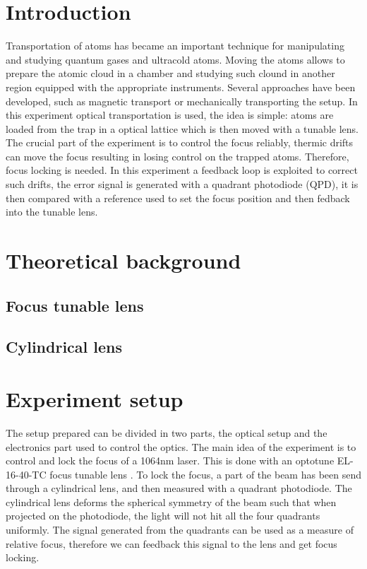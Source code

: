 \documentclass[a4paper,10pt]{article}
\begin{document}
\section{Introduction}
Transportation of atoms has became an important technique for manipulating and studying quantum gases and ultracold atoms. Moving the atoms allows to prepare the atomic cloud in a chamber and studying such clound in another region equipped with the appropriate instruments. Several approaches have been developed, such as magnetic transport or mechanically transporting the setup. In this experiment optical transportation is used, the idea is simple: atoms are loaded from the trap in a optical lattice which is then moved with a tunable lens. The crucial part of the experiment is to control the focus reliably, thermic drifts can move the focus resulting in losing control on the trapped atoms. Therefore, focus locking is needed. In this experiment a feedback loop is exploited to correct such drifts, the error signal is generated with a quadrant photodiode (QPD), it is then compared with a reference used to set the focus position and then fedback into the tunable lens.

\section{Theoretical background}
\subsection{Focus tunable lens}
\subsection{Cylindrical lens}
\section{Experiment setup}



The setup prepared can be divided in two parts, the optical setup and the electronics part used to control the optics. The main idea of the experiment is to control and lock the focus of a 1064nm laser. This is done with an optotune EL-16-40-TC focus tunable lens \cite{lens_datasheet}. To lock the focus, a part of the beam has been send through a cylindrical lens, and then measured with a quadrant photodiode. The cylindrical lens deforms the spherical symmetry of the beam such that when projected on the photodiode, the light will not hit all the four quadrants uniformly. The signal generated from the quadrants can be used as a measure of relative focus, therefore we can feedback this signal to the lens and get focus locking.
\end{document}
